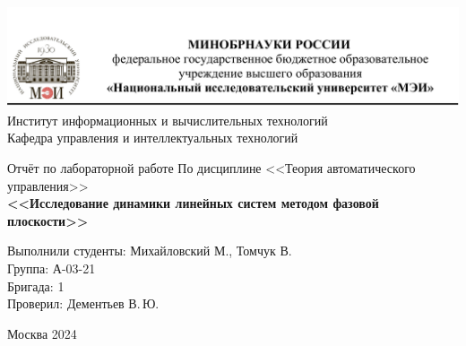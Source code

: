 \begin{titlepage}
	\newpage
	\begin{center}
		\includegraphics[width=\textwidth]{tit.png}
		Институт информационных и вычислительных технологий \\
			Кафедра управления и интеллектуальных технологий
		\vspace{1.25cm}
	\end{center}
	
	\vspace{1.2em}
	
	\begin{center}
		\begin{spacing}{1}
			{\Large Отчёт по лабораторной работе \linebreak
			По дисциплине <<Теория автоматического управления>> \\}
			\vspace{0.3em}
			\large{\bf<<Исследование динамики линейных систем методом фазовой плоскости>>}
		\end{spacing}
	\end{center}
	
	\vspace{5em}
	

	\vspace{6em}
	
		\noindent Выполнили студенты: Михайловский М., Томчук В. \\
		Группа: А-03-21 \\
		Бригада: 1\\
		Проверил: Дементьев В.\,Ю.
	
	
	\vspace{\fill}
	
	\begin{center}
		Москва 2024
	\end{center}
	
\end{titlepage}